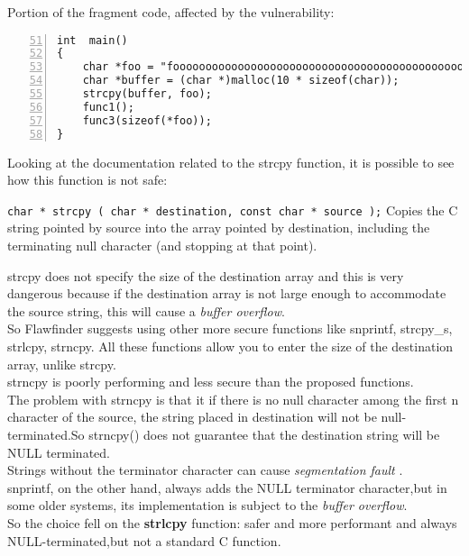 \documentclass[a4paper,12pt]{article}
\newenvironment{SpecialPar}
  {\begin{shaded}}
  {\end{shaded}}
\begin{document}
Portion of the fragment code, affected by the vulnerability:
\begin{lstlisting}[style=c,numbers=left,firstnumber=51,linebackgroundcolor={\ifnum\value{lstnumber}=55\color{red}\fi}]
int  main()
{
	char *foo = "fooooooooooooooooooooooooooooooooooooooooooooooooooo";
	char *buffer = (char *)malloc(10 * sizeof(char));
	strcpy(buffer, foo);
	func1();
	func3(sizeof(*foo));
}
\end{lstlisting}
Looking at the documentation related to the strcpy function\cite{strcpy}, it is possible to see how this function is not safe:\\
\begin{SpecialPar}
\noindent
\texttt{char * strcpy ( char * destination, const char * source );}
Copies the C string pointed by source into the array 		pointed by destination, including the terminating null character (and stopping at that point).
\end{SpecialPar}
\noindent
strcpy does not specify the size of the destination array and this is very dangerous because if the destination array is not large enough to accommodate the source string, this will cause a \textit{buffer overflow}.\\
So Flawfinder suggests using other more secure functions like snprintf, strcpy\_s, strlcpy, strncpy.
All these functions allow you to enter the size of the destination array, unlike strcpy.\\
strncpy is poorly performing and less secure than the proposed functions.\\
The problem with strncpy is that it if there is no null character among the first n character of the source, the string placed in destination will not be null-terminated.So strncpy() does not guarantee that the destination string will be NULL terminated.\\ Strings without the terminator character can cause \textit{segmentation fault} \cite{geeksstrcpy}.\\
snprintf, on the other hand, always adds the NULL terminator character,but in some older systems, its implementation is subject to the \textit{buffer overflow}\cite{dangerc}.\\
So the choice fell on the \textbf{strlcpy} function: safer and more performant \cite{dangerc} and always NULL-terminated,but not a standard C function.\\
\end{document}
